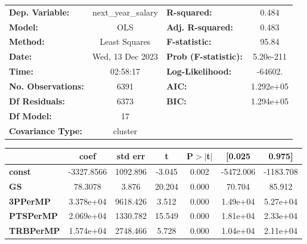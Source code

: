 \begin{center}
\begin{tabular}{lclc}
\toprule
\textbf{Dep. Variable:}             & next\_year\_salary & \textbf{  R-squared:         } &     0.484   \\
\textbf{Model:}                     &        OLS         & \textbf{  Adj. R-squared:    } &     0.483   \\
\textbf{Method:}                    &   Least Squares    & \textbf{  F-statistic:       } &     95.84   \\
\textbf{Date:}                      &  Wed, 13 Dec 2023  & \textbf{  Prob (F-statistic):} & 5.20e-211   \\
\textbf{Time:}                      &      02:58:17      & \textbf{  Log-Likelihood:    } &   -64602.   \\
\textbf{No. Observations:}          &         6391       & \textbf{  AIC:               } & 1.292e+05   \\
\textbf{Df Residuals:}              &         6373       & \textbf{  BIC:               } & 1.294e+05   \\
\textbf{Df Model:}                  &           17       & \textbf{                     } &             \\
\textbf{Covariance Type:}           &      cluster       & \textbf{                     } &             \\
\bottomrule
\end{tabular}
\begin{tabular}{lcccccc}
                                    & \textbf{coef} & \textbf{std err} & \textbf{t} & \textbf{P$> |$t$|$} & \textbf{[0.025} & \textbf{0.975]}  \\
\midrule
\textbf{const}                      &   -3327.8566  &     1092.896     &    -3.045  &         0.002        &    -5472.006    &    -1183.708     \\
\textbf{GS}                         &      78.3078  &        3.876     &    20.204  &         0.000        &       70.704    &       85.912     \\
\textbf{3PPerMP}                    &    3.378e+04  &     9618.426     &     3.512  &         0.000        &     1.49e+04    &     5.27e+04     \\
\textbf{PTSPerMP}                   &    2.069e+04  &     1330.782     &    15.549  &         0.000        &     1.81e+04    &     2.33e+04     \\
\textbf{TRBPerMP}                   &    1.574e+04  &     2748.466     &     5.728  &         0.000        &     1.04e+04    &     2.11e+04     \\

\end{tabular}
\end{center}
